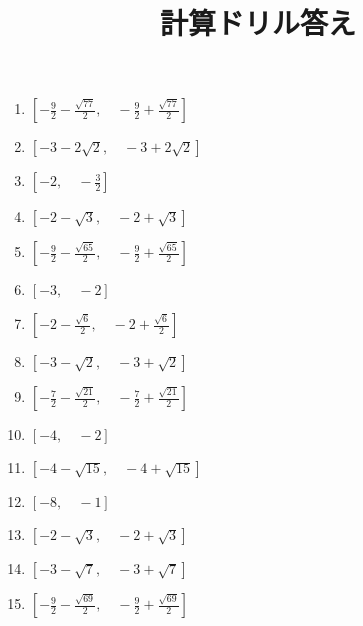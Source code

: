 \documentclass[9pt,dvipdfmx,a4paper]{article}
\begin{document}
    
\title{計算ドリル答え} 
\date{} 
\maketitle
\begin{multicols}{2}
 \begin{enumerate}

\item
$ \left [ - \frac{9}{2} - \frac{\sqrt{77}}{2}, \quad - \frac{9}{2} + \frac{\sqrt{77}}{2}\right ]$

\item
$ \left [ -3 - 2 \sqrt{2}, \quad -3 + 2 \sqrt{2}\right ]$

\item
$ \left [ -2, \quad - \frac{3}{2}\right ]$

\item
$ \left [ -2 - \sqrt{3}, \quad -2 + \sqrt{3}\right ]$

\item
$ \left [ - \frac{9}{2} - \frac{\sqrt{65}}{2}, \quad - \frac{9}{2} + \frac{\sqrt{65}}{2}\right ]$

\item
$ \left [ -3, \quad -2\right ]$

\item
$ \left [ -2 - \frac{\sqrt{6}}{2}, \quad -2 + \frac{\sqrt{6}}{2}\right ]$

\item
$ \left [ -3 - \sqrt{2}, \quad -3 + \sqrt{2}\right ]$

\item
$ \left [ - \frac{7}{2} - \frac{\sqrt{21}}{2}, \quad - \frac{7}{2} + \frac{\sqrt{21}}{2}\right ]$

\item
$ \left [ -4, \quad -2\right ]$

\item
$ \left [ -4 - \sqrt{15}, \quad -4 + \sqrt{15}\right ]$

\item
$ \left [ -8, \quad -1\right ]$

\item
$ \left [ -2 - \sqrt{3}, \quad -2 + \sqrt{3}\right ]$

\item
$ \left [ -3 - \sqrt{7}, \quad -3 + \sqrt{7}\right ]$

\item
$ \left [ - \frac{9}{2} - \frac{\sqrt{69}}{2}, \quad - \frac{9}{2} + \frac{\sqrt{69}}{2}\right ]$


\end{enumerate}
\end{multicols}
\end{document}
